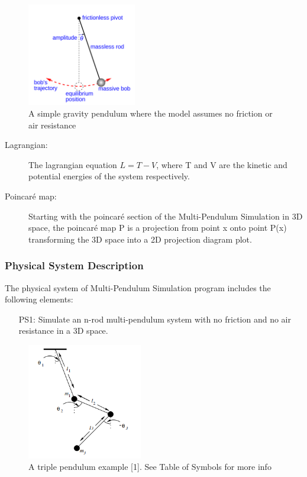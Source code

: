 \documentclass[12pt]{article}
\newcommand{\progname}{Multi-Pendulum Simulation }
\begin{document}
\begin{figure}[H]
	\centering
	\includegraphics[width=180px]{simple-pend.png}
\caption{A simple gravity pendulum where the model assumes no friction or air
resistance}
	\label{fig:maxresdefault}
\end{figure}

\begin{description}
\item[Lagrangian:] The lagrangian equation $L=T-V$, where T and V are the kinetic and potential
energies of the system respectively.
\item[Poincaré map:] Starting with the poincaré section of the \progname in 3D space, the poincaré map P
is a projection from point x onto point P(x) transforming the 3D space into a 2D projection diagram plot.
\end{description}

\subsubsection{Physical System Description}

The physical system of \progname program includes the following elements:

\begin{itemize}
\item[PS1:] Simulate an n-rod multi-pendulum system with no friction and no air
resistance in a 3D space.
\end{itemize}

\begin{figure}[H]
	\centering
	\includegraphics[width=190px]{triplependula.PNG}
\caption{A triple pendulum example [1]. See Table of Symbols for more info}
	\label{fig:maxresdefault}
\end{figure}
\end{document}
